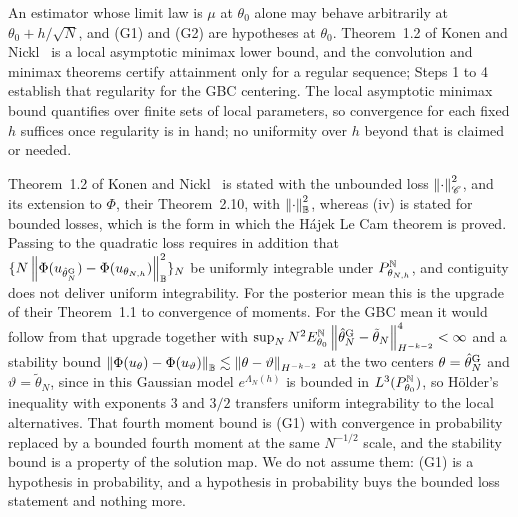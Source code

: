 \begin{remark}\label{m:rem:lam}
An estimator whose limit law is $\mu$ at $\theta_0$ alone may behave arbitrarily at $\theta_0+h/\sqrt N$, and (G1) and (G2) are hypotheses at $\theta_0$. Theorem~1.2 of Konen and Nickl~\cite{konennickl2026} is a local asymptotic minimax lower bound, and the convolution and minimax theorems certify attainment only for a regular sequence; Steps 1 to 4 establish that regularity for the GBC centering. The local asymptotic minimax bound quantifies over finite sets of local parameters, so convergence for each fixed $h$ suffices once regularity is in hand; no uniformity over $h$ beyond that is claimed or needed.

Theorem~1.2 of Konen and Nickl~\cite{konennickl2026} is stated with the unbounded loss $\left\|\cdot\right\|^2_{\mathscr{C}}$, and its extension to $\Phi$, their Theorem~2.10, with $\left\|\cdot\right\|^2_{\mathbb B}$, whereas (iv) is stated for bounded losses, which is the form in which the H\'ajek Le Cam theorem is proved. Passing to the quadratic loss requires in addition that $\{N\left\|\Phi(u_{\hat\theta^{\rm G}_N})-\Phi(u_{\theta_{N,h}})\right\|^2_{\mathbb B}\}_N$ be uniformly integrable under $P^{\mathbb{N}}_{\theta_{N,h}}$, and contiguity does not deliver uniform integrability. For the posterior mean this is the upgrade of their Theorem~1.1 to convergence of moments. For the GBC mean it would follow from that upgrade together with $\sup_NN^2E^{\mathbb{N}}_{\theta_0}\left\|\hat\theta^{\rm G}_N-\tilde\theta_N\right\|^4_{H^{-k-2}}<\infty$ and a stability bound $\left\|\Phi(u_\theta)-\Phi(u_\vartheta)\right\|_{\mathbb B}\lesssim\left\|\theta-\vartheta\right\|_{H^{-k-2}}$ at the two centers $\theta=\hat\theta^{\rm G}_N$ and $\vartheta=\tilde\theta_N$, since in this Gaussian model $e^{\Lambda_N(h)}$ is bounded in $L^3(P^{\mathbb{N}}_{\theta_0})$, so H\"older's inequality with exponents $3$ and $3/2$ transfers uniform integrability to the local alternatives. That fourth moment bound is (G1) with convergence in probability replaced by a bounded fourth moment at the same $N^{-1/2}$ scale, and the stability bound is a property of the solution map. We do not assume them: (G1) is a hypothesis in probability, and a hypothesis in probability buys the bounded loss statement and nothing more.
\end{remark}

